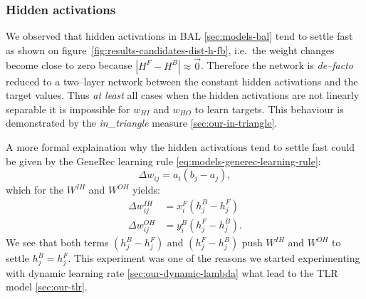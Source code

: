 
\subsubsection{Hidden activations}
\label{sec:our-hidden-activation} 

We observed that hidden activations in BAL \ref{sec:models-bal} tend to settle fast as shown on figure~\ref{fig:results-candidates-dist-h-fb}, i.e.~the weight changes become close to zero because $|H^F - H^B| \approx \overrightarrow{0}$. Therefore the network is \emph{de--facto} reduced to a two--layer network between the constant hidden activations and the target values. Thus \emph{at least} all cases when the hidden activations are not linearly separable it is impossible for $w_{HI}$ and $w_{HO}$ to learn targets. This behaviour is demonstrated by the \emph{in\_triangle} measure \ref{sec:our-in-triangle}. 

A more formal explaination why the hidden activations tend to settle fast could be given by the GeneRec learning rule \ref{eq:models-generec-learning-rule}: 
\begin{equation} 
  \Delta w_{ij} = a_i(b_j - a_j),
\end{equation} \nonumber 
which for the $W^{IH}$ and $W^{OH}$ yields: 
\begin{align} 
  \Delta w_{ij}^{IH} &= x^F_i(h^B_j - h^F_j) \nonumber \\ 
  \Delta w_{ij}^{OH} &= y^B_i(h^F_j - h^B_j). \nonumber  
\end{align} 
We see that both terms $(h^B_j - h^F_j)$ and $(h^F_j - h^B_j)$ push $W^{IH}$ and $W^{OH}$ to settle $h^B_j = h^F_j$. This experiment was one of the reasons we started experimenting with dynamic learning rate \ref{sec:our-dynamic-lambda} what lead to the TLR model \ref{sec:our-tlr}. 

